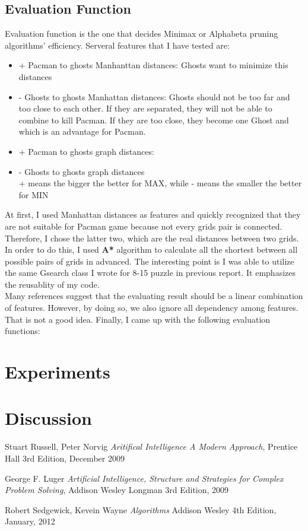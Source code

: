 \documentclass[a4paper, 11pt]{article}
\begin{document}
\subsection{Evaluation Function}
Evaluation function is the one that decides Minimax or Alphabeta pruning algorithms' efficiency. Serveral features that I have tested are:
\begin{itemize}
\item{+} Pacman to ghosts Manhanttan distances: Ghosts want to minimize this distances
\item{-} Ghosts to ghosts Manhattan distances: Ghosts should not be too far and too close to each other. If they are separated, they will not be able to combine to kill Pacman. If they are too close, they become one Ghost and which is an advantage for Pacman.
\item{+} Pacman to ghosts graph distances:
\item{-} Ghosts to ghosts graph distances \\
+ means the bigger the better for MAX, while - means the smaller the better for MIN
\end{itemize}
At first, I used Manhattan distances as features and quickly recognized that they are not suitable for Pacman game because not every grids pair is connected. Therefore, I chose the latter two, which are the real distances between two grids. In order to do this, I used \textbf{A*} algorithm to calculate all the shortest between all possible pairs of grids in advanced. The interesting point is I was able to utilize the same Gsearch class I wrote for 8-15 puzzle in previous report. It emphasizes the reusablity of my code. \\
Many references suggest that the evaluating result should be a linear combination of features. However, by doing so, we also ignore all dependency among features. That is not a good idea. Finally, I came up with the following evaluation functions: 
\[\] 
\section{Experiments}

\section{Discussion}

\begin{thebibliography}{9}
  \label{itm:AIMA}
  Stuart Russell, Peter Norvig
  \emph{  Aritifical Intelligence A Modern Approach},
  Prentice Hall
  3rd Edition,
  December 2009

  \label{itm:SSCPS}
  George F. Luger
  \emph{Artificial Intelligence, Structure and Strategies for Complex Problem Solving},
  Addison Wesley Longman
  3rd Edition,
  2009
  
  \label{itm:algorithm}
  Robert Sedgewick, Kevein Wayne
  \emph{ Algorithms}
  Addison Wesley
  4th Edition,
  January, 2012

\end{thebibliography}
\end{document}
